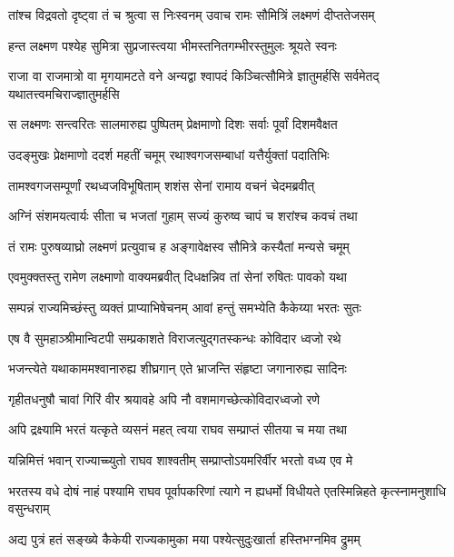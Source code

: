 \twolineshloka
{तांश्च विद्रवतो दृष्ट्वा तं च श्रुत्वा स निःस्वनम्}
{उवाच रामः सौमित्रिं लक्ष्मणं दीप्ततेजसम्} %

\twolineshloka
{हन्त लक्ष्मण पश्येह सुमित्रा सुप्रजास्त्वया}
{भीमस्तनितगम्भीरस्तुमुलः श्रूयते स्वनः} %

\threelineshloka
{राजा वा राजमात्रो वा मृगयामटते वने}
{अन्यद्वा श्वापदं किञ्चित्सौमित्रे ज्ञातुमर्हसि}
{सर्वमेतद् यथातत्त्वमचिराज्ज्ञातुमर्हसि} %

\twolineshloka
{स लक्ष्मणः सन्त्वरितः सालमारुह्य पुष्पितम्}
{प्रेक्षमाणो दिशः सर्वाः पूर्वां दिशमवैक्षत} %

\twolineshloka
{उदङ्मुखः प्रेक्षमाणो ददर्श महतीं चमूम्}
{रथाश्वगजसम्बाधां यत्तैर्युक्तां पदातिभिः} %

\twolineshloka
{तामश्वगजसम्पूर्णां रथध्वजविभूषिताम्}
{शशंस सेनां रामाय वचनं चेदमब्रवीत्} %

\twolineshloka
{अग्निं संशमयत्वार्यः सीता च भजतां गुहाम्}
{सज्यं कुरुष्व चापं च शरांश्च कवचं तथा} %

\twolineshloka
{तं रामः पुरुषव्याघ्रो लक्ष्मणं प्रत्युवाच ह}
{अङ्गावेक्षस्व सौमित्रे कस्यैतां मन्यसे चमूम्} %

\twolineshloka
{एवमुक्क्तस्तु रामेण लक्ष्माणो वाक्यमब्रवीत्}
{दिधक्षन्निव तां सेनां रुषितः पावको यथा} %

\twolineshloka
{सम्पन्नं राज्यमिच्छंस्तु व्यक्तं प्राप्याभिषेचनम्}
{आवां हन्तुं समभ्येति कैकेय्या भरतः सुतः} %

\twolineshloka
{एष वै सुमहाञ्श्रीमान्विटपी सम्प्रकाशते}
{विराजत्युद्गतस्कन्धः कोविदार ध्वजो रथे} %

\twolineshloka
{भजन्त्येते यथाकाममश्वानारुह्य शीघ्रगान्}
{एते भ्राजन्ति संहृष्टा जगानारुह्य सादिनः} %

\twolineshloka
{गृहीतधनुषौ चावां गिरिं वीर श्रयावहे}
{अपि नौ वशमागच्छेत्कोविदारध्वजो रणे} %

\twolineshloka
{अपि द्रक्ष्यामि भरतं यत्कृते व्यसनं महत्}
{त्वया राघव सम्प्राप्तं सीतया च मया तथा} %

\twolineshloka
{यन्निमित्तं भवान् राज्याच्च्युतो राघव शाश्वतीम्}
{सम्प्राप्तोऽयमरिर्वीर भरतो वध्य एव मे} %

\threelineshloka
{भरतस्य वधे दोषं नाहं पश्यामि राघव}
{पूर्वापकरिणां त्यागे न ह्यधर्मो विधीयते}
{एतस्मिन्निहते कृत्स्नामनुशाधि वसुन्धराम्} %

\twolineshloka
{अद्य पुत्रं हतं सङ्ख्ये कैकेयी राज्यकामुका}
{मया पश्येत्सुदुःखार्ता हस्तिभग्नमिव द्रुमम्} %

